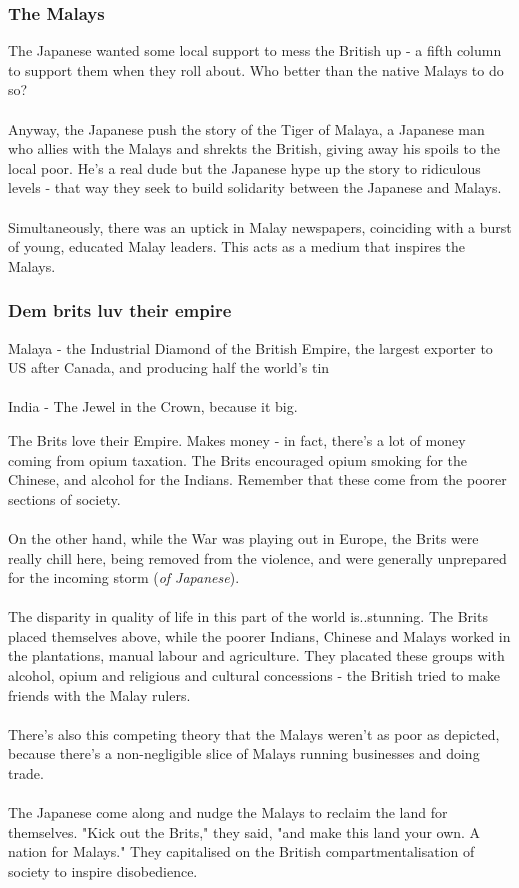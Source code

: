 \documentclass[a4paper]{article}
\begin{document}
\subsubsection{The Malays}
The Japanese wanted some local support to mess the British up - a fifth column to support them when they roll about. Who better than the native Malays to do so?\\
\\
Anyway, the Japanese push the story of the Tiger of Malaya, a Japanese man who allies with the Malays and shrekts the British, giving away his spoils to the local poor. He's a real dude but the Japanese hype up the story to ridiculous levels - that way they seek to build solidarity between the Japanese and Malays.\\
\\
Simultaneously, there was an uptick in Malay newspapers, coinciding with a burst of young, educated Malay leaders. This acts as a medium that inspires the Malays.
\newpage
\subsubsection{Dem brits luv their empire}
\begin{framed}
	\begin{displayquote}
		Malaya - the Industrial Diamond of the British Empire, the largest exporter to US after Canada, and producing half the world's tin\\
		\\
		India - The Jewel in the Crown, because it big.
	\end{displayquote}
\end{framed}
The Brits love their Empire. Makes money - in fact, there's a lot of money coming from opium taxation. The Brits encouraged opium smoking for the Chinese, and alcohol for the Indians. Remember that these come from the poorer sections of society.\\
\\
On the other hand, while the War was playing out in Europe, the Brits were really chill here, being removed from the violence, and were generally unprepared for the incoming storm (\textit{of Japanese}).\\
\\
The disparity in quality of life in this part of the world is..stunning. The Brits placed themselves above, while the poorer Indians, Chinese and Malays worked in the plantations, manual labour and agriculture. They placated these groups with alcohol, opium and religious and cultural concessions - the British tried to make friends with the Malay rulers.\\
\\
There's also this competing theory that the Malays weren't as poor as depicted, because there's a non-negligible slice of Malays running businesses and doing trade.\\
\\
The Japanese come along and nudge the Malays to reclaim the land for themselves. "Kick out the Brits," they said, "and make this land your own. A nation for Malays." They capitalised on the British compartmentalisation of society to inspire disobedience.
\end{document}
